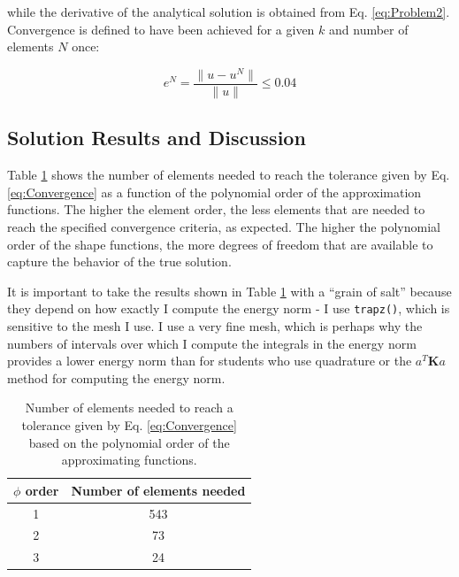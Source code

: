 \documentclass[10pt]{article}
\begin{document}
while the derivative of the analytical solution is obtained from Eq. \eqref{eq:Problem2}. Convergence is defined to have been achieved for a given \(k\) and number of elements \(N\) once:

\begin{equation}
\label{eq:Convergence}
e^N=\frac{\|u-u^N\|}{\|u\|} \leq 0.04
\end{equation}

\subsection{Solution Results and Discussion}

Table \ref{table:orders} shows the number of elements needed to reach the tolerance given by Eq. \eqref{eq:Convergence} as a function of the polynomial order of the approximation functions. The higher the element order, the less elements that are needed to reach the specified convergence criteria, as expected. The higher the polynomial order of the shape functions, the more degrees of freedom that are available to capture the behavior of the true solution. 

It is important to take the results shown in Table \ref{table:orders} with a ``grain of salt'' because they depend on how exactly I compute the energy norm - I use \texttt{trapz()}, which is sensitive to the mesh I use. I use a very fine mesh, which is perhaps why the numbers of intervals over which I compute the integrals in the energy norm provides a lower energy norm than for students who use quadrature or the \(a^T\textbf{K}a\) method for computing the energy norm. 

\begin{table}[H]
\caption{Number of elements needed to reach a tolerance given by Eq. \eqref{eq:Convergence} based on the polynomial order of the approximating functions.}
\centering
\begin{tabular}{c c}
\hline\hline
\(\phi\) order & Number of elements needed\\ [0.5ex]
\hline
1 & 543\\
2 & 73\\
3 & 24\\
\hline
\end{tabular}
\label{table:orders}
\end{table}
\end{document}
